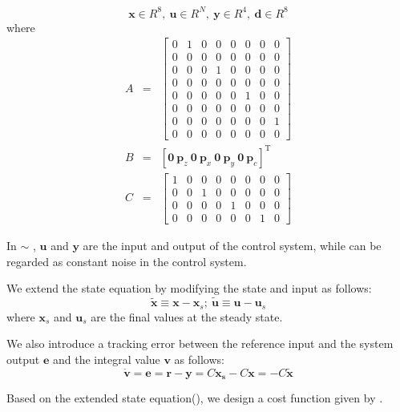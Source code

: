 \begin{equation*}
  \bm{x} \in  R^8, \ \bm{u} \in R^N, \ \bm{y} \in R^4, \ \bm{d} \in R^8
\end{equation*}
where 
\begin{eqnarray*}
  A&=&
  \begin{bmatrix}
    0 &1 &0 &0 &0 &0 &0 &0\\
    0 &0 &0 &0 &0 &0 &0 &0\\
    0 &0 &0 &1 &0 &0 &0 &0\\
    0 &0 &0 &0 &0 &0 &0 &0\\
    0 &0 &0 &0 &0 &1 &0 &0\\
    0 &0 &0 &0 &0 &0 &0 &0\\
    0 &0 &0 &0 &0 &0 &0 &1\\
    0 &0 &0 &0 &0 &0 &0 &0
  \end{bmatrix}\\
  B&=&[\bm{0} \ \bm{p}_z \ \bm{0} \ \bm{p}_x \ \bm{0} \ \bm{p}_y \ \bm{0} \ \bm{p}_c]^\mathrm{T}\\
  C&=&
  \begin{bmatrix}
    1 &0 &0 &0 &0 &0 &0 &0\\
    0 &0 &1 &0 &0 &0 &0 &0\\
    0 &0 &0 &0 &1 &0 &0 &0\\
    0 &0 &0 &0 &0 &0 &1 &0
  \end{bmatrix}
\end{eqnarray*}

In  $\sim$ , $\bm{u}$ and $\bm{y}$ are the input and output of the control system, while
can be regarded as constant noise in the control system. 
\par
We extend the state equation by modifying the state and input as follows:
\begin{equation}
  \tilde{\bm{x}} \equiv \bm{x}-\bm{x}_s; \ \tilde{\bm{u}} \equiv \bm{u}-\bm{u}_s 
\end{equation}
where $\bm{x}_s$ and $\bm{u}_s$ are the final values at the steady state.
\par
We also introduce a tracking error between the reference input and the system output $\bm{e}$ and the integral value $\bm{v}$ as follows: 
\begin{equation}
  \dot{\bm{v}}=\bm{e}=\bm{r}-\bm{y}=C\bm{x_s}-C\bm{x}=-C\tilde{\bm{x}}
\end{equation}
\par
Based on the extended state equation(), we design a cost function given by .

